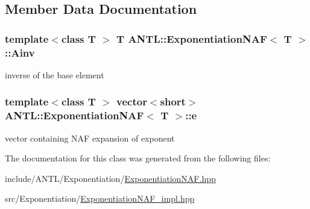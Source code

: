 \subsection{Member Data Documentation}
\hypertarget{classANTL_1_1ExponentiationNAF_a3daf8a194f65ea69e18882e03e2d9af7}{
\subsubsection[{Ainv}]{\setlength{\rightskip}{0pt plus 5cm}template$<$class T $>$ T {\bf A\-N\-T\-L\-::\-Exponentiation\-N\-A\-F}$<$ T $>$\-::Ainv\hspace{0.3cm}{\ttfamily [protected]}}}\label{classANTL_1_1ExponentiationNAF_a3daf8a194f65ea69e18882e03e2d9af7}
inverse of the base element \hypertarget{classANTL_1_1ExponentiationNAF_a9cbe814c668d82453284afc1f662e3e2}{
\subsubsection[{e}]{\setlength{\rightskip}{0pt plus 5cm}template$<$class T $>$ vector$<$short$>$ {\bf A\-N\-T\-L\-::\-Exponentiation\-N\-A\-F}$<$ T $>$\-::e\hspace{0.3cm}{\ttfamily [protected]}}}\label{classANTL_1_1ExponentiationNAF_a9cbe814c668d82453284afc1f662e3e2}
vector containing N\-A\-F expansion of exponent 

The documentation for this class was generated from the following files\-:\begin{DoxyCompactItemize}
\item 
include/\-A\-N\-T\-L/\-Exponentiation/\hyperlink{ExponentiationNAF_8hpp}{Exponentiation\-N\-A\-F.\-hpp}\item 
src/\-Exponentiation/\hyperlink{ExponentiationNAF__impl_8hpp}{Exponentiation\-N\-A\-F\-\_\-impl.\-hpp}\end{DoxyCompactItemize}
